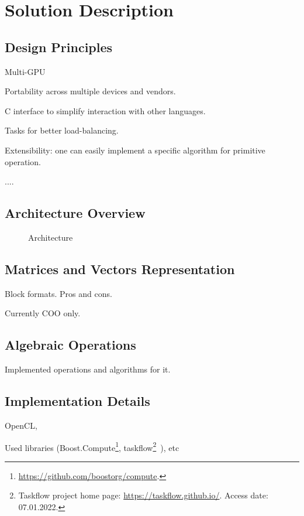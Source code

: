 \section{Solution Description}

\subsection{Design Principles}

Multi-GPU

Portability across multiple devices and vendors.

C interface to simplify interaction with other languages. 

Tasks for better load-balancing.

Extensibility: one can easily implement a specific algorithm for primitive operation.


....


\subsection{Architecture Overview}

\begin{figure}[htbp]
\caption{Architecture}
\label{fig}
\end{figure}
    
\subsection{Matrices and Vectors Representation}

Block formats. Pros and cons. 

Currently COO only.

\subsection{Algebraic Operations}

Implemented operations and algorithms for it.

\subsection{Implementation Details}

OpenCL, 

Used libraries (Boost.Compute\footnote{\url{https://github.com/boostorg/compute}.}, taskflow\footnote{Taskflow project home page: \url{https://taskflow.github.io/}. Access date: 07.01.2022.}~\cite{Huang2022TaskflowAL}),  etc